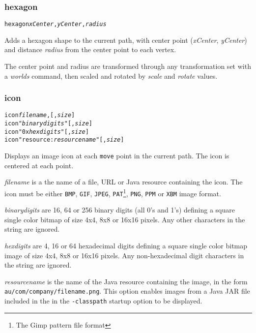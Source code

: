 \subsubsection{hexagon}

\begin{alltt}
hexagon \textit{xCenter}, \textit{yCenter}, \textit{radius}
\end{alltt}

Adds a hexagon shape to the current path, with center
point (\textit{xCenter}, \textit{yCenter}) and distance
\textit{radius}
from the center point to each vertex.

The center point and radius are transformed through any
transformation set with a \textit{worlds} command,
then scaled and rotated by \textit{scale}
and \textit{rotate} values.

\subsubsection{icon}

\begin{alltt}
icon \textit{filename}, [, \textit{size}]
icon "\textit{binarydigits}" [, \textit{size}]
icon "0x\textit{hexdigits}" [, \textit{size}]
icon "resource:\textit{resourcename}" [, \textit{size}]
\end{alltt}

Displays an image icon at each \texttt{move} point in
the current path.  The icon is centered at each point.

\textit{filename} is a the name of a file, URL or Java resource
containing the icon.
The icon must be either \texttt{BMP}, \texttt{GIF}, \texttt{JPEG},
\texttt{PAT}\footnote{The Gimp pattern file format},
\texttt{PNG},
\texttt{PPM} or
\texttt{XBM} image format.

\textit{binarydigits} are 16, 64 or 256 binary digits (all 0's and 1's)
defining a square single color bitmap of size 4x4, 8x8 or 16x16 pixels.
Any other characters in the string are ignored.

\textit{hexdigits} are 4, 16 or 64 hexadecimal digits defining
a square single color bitmap image of size 4x4, 8x8 or 16x16 pixels.
Any non-hexadecimal digit characters in the string are ignored.

\textit{resourcename} is the name of the Java resource containing the
image, in the form \texttt{au/com/company/filename.png}.
This option enables images from a Java JAR file included in the 
in the \texttt{-classpath} startup option to be displayed.

